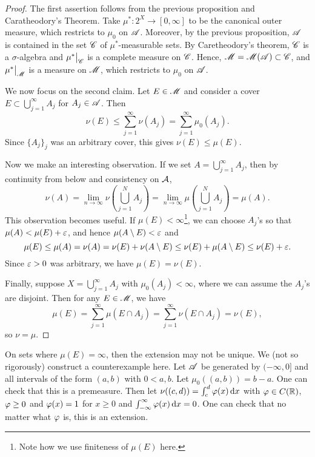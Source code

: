 \documentclass[12pt]{article} %
\begin{document}
\begin{proof}
    The first assertion follows from the previous proposition and Caratheodory's Theorem. Take $\mu^* : 2^X \to [0, \infty]$ to be the canonical outer measure, which restricts to $\mu_0$ on $\mathscr{A}$. Moreover, by the previous proposition, $\mathscr{A}$ is contained in the set $\mathscr{C}$ of $\mu^*$-measurable sets. By Caretheodory's theorem, $\mathscr{C}$ is a $\sigma$-algebra and $\restr{\mu^*}{\SC}$ is a complete measure on $\mathscr{C}$. Hence, $\mathscr{M} = \mathscr{M}(\mathscr{A}) \subset \mathscr{C}$, and $\restr{\mu^*}{\SM}$ is a measure on $\mathscr{M}$, which restricts to $\mu_0$ on $\mathscr{A}$.

    We now focus on the second claim. Let $E \in \mathscr{M}$ and consider a cover $E \subset \bigcup_{j=1}^{\infty} A_j$ for $A_j \in \mathscr{A}$. Then \[\nu(E) \leq \sum_{j=1}^{\infty} \nu(A_j) = \sum_{j=1}^{\infty} \mu_0(A_j).\] Since $\{A_j\}_j$ was an arbitrary cover, this gives $\nu(E) \leq \mu(E)$.

    Now we make an interesting observation. If we set $A = \bigcup_{j=1}^{\infty} A_j$, then by continuity from below and consistency on $\mathcal{A}$, \[\nu(A) = \lim_{n\to \infty} \nu\left(\bigcup_{j=1}^{N} A_j\right) = \lim_{n \to \infty} \mu\left(\bigcup_{j=1}^{N} A_j \right) = \mu(A).\] This observation becomes useful. If $\mu(E) < \infty$\footnote{Note how we use finiteness of $\mu(E)$ here.}, we can choose $A_j$'s so that $\mu(A) < \mu(E) + \varepsilon$, and hence $\mu(A \setminus E) < \varepsilon$ and \[\mu(E) \leq \mu(A) = \nu(A) = \nu(E) + \nu(A \setminus E) \leq \nu(E) + \mu(A \setminus E) \leq \nu(E) + \varepsilon.\] Since $\varepsilon > 0$ was arbitrary, we have $\mu(E) = \nu(E)$.

    Finally, suppose $X = \bigcup_{j=1}^{\infty} A_j$ with $\mu_0(A_j) < \infty$, where we can assume the $A_j$'s are disjoint. Then for any $E \in \mathscr{M}$, we have \[\mu(E) = \sum_{j=1}^{\infty} \mu(E \cap A_j) = \sum_{j=1}^{\infty} \nu(E \cap A_j) = \nu(E),\] so $\nu = \mu$.
\end{proof}

\begin{remark}
    On sets where $\mu(E) = \infty$, then the extension may not be unique. We (not so rigorously) construct a counterexample here. Let $\mathscr{A}$ be generated by $(-\infty, 0]$ and all intervals of the form $(a, b)$ with $0 < a, b$. Let $\mu_0((a, b)) = b-a$. One can check that this is a premeasure. Then let $\nu((c, d)) = \int_c^d \varphi(x) \, \mathrm{d} x$ with $\varphi \in C(\mathbb{R})$, $\varphi\geq 0$ and $\varphi(x) = 1$ for $x \geq 0$ and $\int_{-\infty}^{\infty} \varphi(x) \, \mathrm{d} x = 0$. One can check that no matter what $\varphi$ is, this is an extension.
\end{remark}
\end{document}
